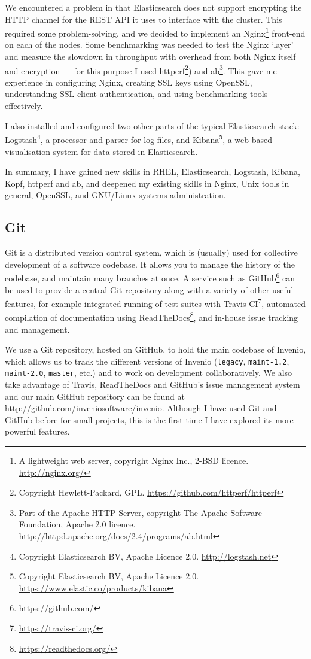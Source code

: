 \documentclass[a4paper,11pt]{article} %
\begin{document}
We encountered a problem in that Elasticsearch does not support encrypting the HTTP channel for the REST API it uses to interface with the cluster.  This required some problem-solving, and we decided to implement an Nginx\footnote{A lightweight web server, copyright Nginx Inc., 2-BSD licence.  \url{http://nginx.org/}} front-end on each of the nodes.  Some benchmarking was needed to test the Nginx `layer' and measure the slowdown in throughput with overhead from both Nginx itself and encryption --- for this purpose I used httperf\footnote{Copyright Hewlett-Packard, GPL.  \url{https://github.com/httperf/httperf}}) and ab\footnote{Part of the Apache HTTP Server, copyright The Apache Software Foundation, Apache 2.0 licence.  \url{http://httpd.apache.org/docs/2.4/programs/ab.html}}.  This gave me experience in configuring Nginx, creating SSL keys using OpenSSL, understanding SSL client authentication, and using benchmarking tools effectively.

I also installed and configured two other parts of the typical Elasticsearch stack: Logstash\footnote{Copyright Elasticsearch BV, Apache Licence 2.0.  \url{http://logstash.net}}, a processor and parser for log files, and Kibana\footnote{Copyright Elasticsearch BV, Apache Licence 2.0.  \url{https://www.elastic.co/products/kibana}}, a web-based visualisation system for data stored in Elasticsearch.

In summary, I have gained new skills in RHEL, Elasticsearch, Logstash, Kibana, Kopf, httperf and ab, and deepened my existing skills in Nginx, Unix tools in general, OpenSSL, and GNU/Linux systems administration.

\subsection{Git}
\label{sec:technical.git}
Git is a distributed version control system, which is (usually) used for collective development of a software codebase.  It allows you to manage the history of the codebase, and maintain many branches at once.  A service such as GitHub\footnote{\url{https://github.com/}} can be used to provide a central Git repository along with a variety of other useful features, for example integrated running of test suites with Travis CI\footnote{\url{https://travis-ci.org/}}, automated compilation of documentation using ReadTheDocs\footnote{\url{https://readthedocs.org/}}, and in-house issue tracking and management.

We use a Git repository, hosted on GitHub, to hold the main codebase of Invenio, which allows us to track the different versions of Invenio (\texttt{legacy}, \texttt{maint-1.2}, \texttt{maint-2.0}, \texttt{master}, etc.) and to work on development collaboratively.  We also take advantage of Travis, ReadTheDocs and GitHub's issue management system and our main GitHub repository can be found at \url{http://github.com/inveniosoftware/invenio}.  Although I have used Git and GitHub before for small projects, this is the first time I have explored its more powerful features.
\end{document}
